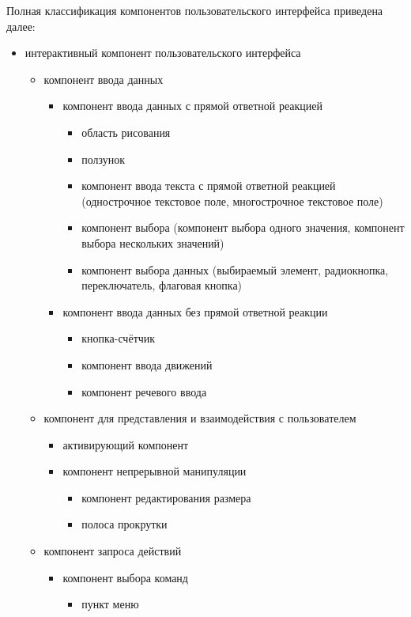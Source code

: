Полная классификация компонентов пользовательского интерфейса приведена далее:
\begin{itemize}
	\item интерактивный компонент пользовательского интерфейса
	\begin{itemize}
		\item компонент ввода данных
		\begin{itemize}
			\item компонент ввода данных с прямой ответной реакцией
			\begin{itemize}
				\item область рисования
				\item ползунок
				\item компонент ввода текста с прямой ответной реакцией (однострочное текстовое поле, многострочное текстовое поле)
				\item компонент выбора (компонент выбора одного значения, компонент выбора нескольких значений)
				\item компонент выбора данных (выбираемый элемент, радиокнопка, переключатель, флаговая кнопка)
			\end{itemize}
			\item компонент ввода данных без прямой ответной реакции
			\begin{itemize}
				\item кнопка-счётчик
				\item компонент ввода движений
				\item компонент речевого ввода
			\end{itemize}
		\end{itemize}
		\item компонент для представления и взаимодействия с пользователем
		\begin{itemize}
			\item активирующий компонент
			\item компонент непрерывной манипуляции
			\begin{itemize}
				\item компонент редактирования размера
				\item полоса прокрутки
			\end{itemize}
		\end{itemize}
		\item компонент запроса действий
		\begin{itemize}
			\item компонент выбора команд
			\begin{itemize}
				\item пункт меню

\end{itemize}
\end{itemize}
\end{itemize}
\end{itemize}
